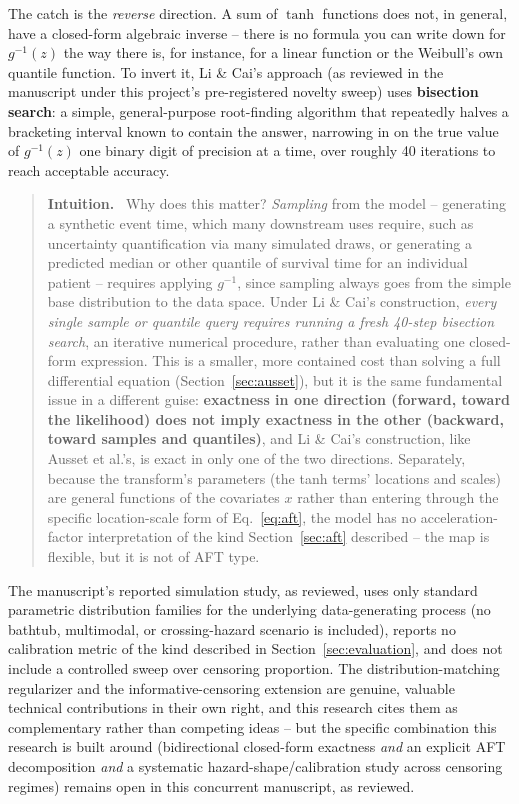 \documentclass[11pt]{article}
\newenvironment{intuition}
  {\par\addvspace{8pt}\begin{quote}\noindent\textbf{\textcolor{blue!40!black}{Intuition.}}\ }
  {\end{quote}\par\addvspace{8pt}}
\begin{document}
The catch is the \emph{reverse} direction. A sum of $\tanh$ functions
does not, in general, have a closed-form algebraic inverse -- there is no
formula you can write down for $g^{-1}(z)$ the way there is, for
instance, for a linear function or the Weibull's own quantile function.
To invert it, Li \& Cai's approach (as reviewed in the manuscript under
this project's pre-registered novelty sweep) uses \textbf{bisection
search}: a simple, general-purpose root-finding algorithm that
repeatedly halves a bracketing interval known to contain the answer,
narrowing in on the true value of $g^{-1}(z)$ one binary digit of
precision at a time, over roughly 40 iterations to reach acceptable
accuracy.

\begin{intuition}
Why does this matter? \emph{Sampling} from the model -- generating a
synthetic event time, which many downstream uses require, such as
uncertainty quantification via many simulated draws, or generating a
predicted median or other quantile of survival time for an individual
patient -- requires applying $g^{-1}$, since sampling always goes from
the simple base distribution to the data space. Under Li \& Cai's
construction, \emph{every single sample or quantile query requires
running a fresh 40-step bisection search}, an iterative numerical
procedure, rather than evaluating one closed-form expression. This is a
smaller, more contained cost than solving a full differential equation
(Section~\ref{sec:ausset}), but it is the same fundamental issue in a
different guise: \textbf{exactness in one direction (forward, toward the
likelihood) does not imply exactness in the other (backward, toward
samples and quantiles)}, and Li \& Cai's construction, like Ausset et
al.'s, is exact in only one of the two directions. Separately, because
the transform's parameters (the tanh terms' locations and scales) are
general functions of the covariates $x$ rather than entering through the
specific location-scale form of Eq.~\eqref{eq:aft}, the model has no
acceleration-factor interpretation of the kind Section~\ref{sec:aft}
described -- the map is flexible, but it is not of AFT type.
\end{intuition}

The manuscript's reported simulation study, as reviewed, uses only
standard parametric distribution families for the underlying
data-generating process (no bathtub, multimodal, or crossing-hazard
scenario is included), reports no calibration metric of the kind
described in Section~\ref{sec:evaluation}, and does not include a
controlled sweep over censoring proportion. The distribution-matching
regularizer and the informative-censoring extension are genuine,
valuable technical contributions in their own right, and this research
cites them as complementary rather than competing ideas -- but the
specific combination this research is built around (bidirectional
closed-form exactness \emph{and} an explicit AFT decomposition \emph{and}
a systematic hazard-shape/calibration study across censoring regimes)
remains open in this concurrent manuscript, as reviewed.
\end{document}
